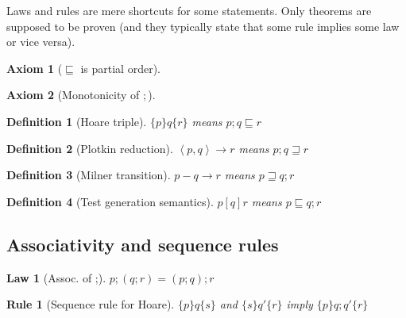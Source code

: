 \documentclass{article}
\begin{document}
\newcommand{\refines}{\sqsubseteq}
\newcommand{\refinedby}{\sqsupseteq}
\newcommand{\eps}{\varepsilon}


\newcommand{\plotkin}[3]{\left< #1, #2 \right> \rightarrow #3}
\newcommand{\milner}[3]{#1-#2\rightarrow #3}


\newtheorem{axiom}{Axiom}
\newtheorem{law}{Law}
\newtheorem{rul}{Rule}  %
\newtheorem{theorem}{Theorem}
\newtheorem{definition}{Definition}

Laws and rules are mere shortcuts for some statements.
Only theorems are supposed to be proven (and they typically state that
some rule implies some law or vice versa).


\begin{axiom} [$\refines$ is partial order]
\end{axiom}

\begin{axiom} [Monotonicity of $;$]
\end{axiom}


\begin{definition} [Hoare triple]
$\{p\}q\{r\}$ means $p;q \refines r$
\end{definition}

\begin{definition} [Plotkin reduction]
$\plotkin{p}{q}{r}$ means $p; q \refinedby r$
\end{definition}

\begin{definition} [Milner transition]
$\milner{p}{q}{r}$ means $p \refinedby q; r$
\end{definition}

\begin{definition} [Test generation semantics]
$p[q]r$ means $p \refines q;r$
\end{definition}


\subsection*{Associativity and sequence rules}

\begin{law}[Assoc. of ;]
$p;(q;r) = (p;q);r$
\end{law}

\begin{rul}[Sequence rule for Hoare]
$\{p\}q\{s\}$ and $\{s\}q'\{r\}$ imply $\{p\}q;q'\{r\}$
\end{rul}
\end{document}
